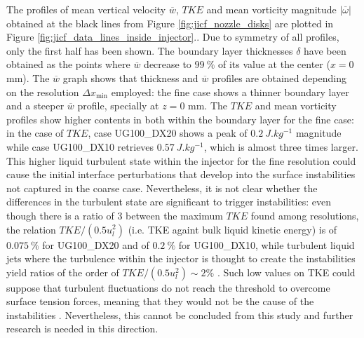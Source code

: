 The profiles of mean vertical velocity $\overline{w}$, $TKE$ and mean vorticity magnitude $|\overline{\omega}|$ obtained at the black lines from Figure \ref{fig:jicf_nozzle_disks} are plotted in Figure \ref{fig:jicf_data_lines_inside_injector}.. Due to symmetry of all profiles, only the first half has been shown. The boundary layer thicknesses $\delta$ have been obtained as the points where $\overline{w}$ decrease to $99~\%$ of its value at the center ($x = 0$ mm). The $\overline{w}$ graph shows that thickness and $\overline{w}$ profiles are obtained depending on the resolution $\Delta x_\mathrm{min}$ employed: the fine case shows a thinner boundary layer and a steeper $\overline{w}$ profile, specially at $z = 0$ mm. The $TKE$ and mean vorticity profiles show higher contents in both within the boundary layer for the fine case: in the case of $TKE$, case UG100\_DX20 shows a peak of $0.2~J.kg^{-1}$ magnitude while case UG100\_DX10 retrieves $0.57~J.kg^{-1}$, which is almost three times larger. This higher liquid turbulent state within the injector for the fine resolution could cause the initial interface perturbations that develop into the surface instabilities not captured in the coarse case. Nevertheless, it is not clear whether the differences in the turbulent state are significant to trigger instabilities: even though there is a ratio of 3 between the maximum $TKE$ found among resolutions, the relation $TKE/ \left( 0.5 u_l^2 \right)$ (i.e. TKE againt bulk liquid kinetic energy) is of $0.075~\%$ for UG100\_DX20 and of $0.2~\%$ for UG100\_DX10, while turbulent liquid jets where the turbulence within the injector is thought to create the instabilities  yield ratios of the order of $TKE/ \left( 0.5 u_l^2 \right) \sim 2 \%$ . Such low values on TKE could suppose that turbulent fluctuations do not reach the threshold to overcome surface tension forces, meaning that they would not be the cause of the instabilities . Nevertheless, this cannot be concluded from this study and further research is needed in this direction.


